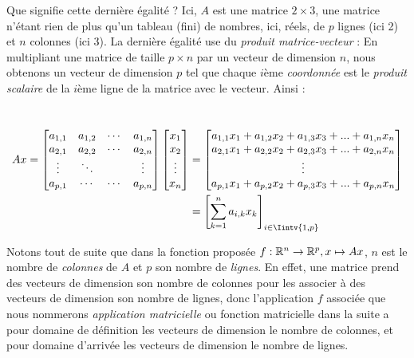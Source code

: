 Que signifie cette dernière égalité ? Ici, $A$ est une matrice $2 \times 3$, une matrice n'étant rien de plus qu'un tableau (fini) de nombres, ici, réels, de $p$ lignes (ici 2) et $n$ colonnes (ici 3). La dernière égalité use du \textit{produit matrice-vecteur} : En multipliant une matrice de taille $p \times n$ par un vecteur de dimension $n$, nous obtenons un vecteur de dimension $p$ tel que chaque $i$ème \textit{coordonnée} est le \textit{produit scalaire} de la $i$ème ligne de la matrice avec le vecteur. Ainsi :
\begin{boxdef}
\label{trueDefProduitMatVec}
\, \begin{align*}
Ax = \begin{bmatrix} a_{1,1} & a_{1,2} & \cdots & a_{1, n} \\ a_{2,1} & a_{2,2} & \cdots & a_{2, n} \\ \vdots & \ddots & & \vdots \\ a_{p,1} & \cdots & \cdots & a_{p,n} \end{bmatrix}\begin{bmatrix} x_1 \\ x_2 \\ \vdots \\ x_n \end{bmatrix}
&= \begin{bmatrix} a_{1,1}x_1 + a_{1,2}x_2 + a_{1,3}x_3 + ... + a_{1, n}x_n \\ a_{2,1}x_1 + a_{2,2}x_2 + a_{2,3}x_3 + ... + a_{2, n}x_n \\ \vdots \\ a_{p,1}x_1 + a_{p,2}x_2 + a_{p,3}x_3 + ... + a_{p, n}x_n \end{bmatrix} \\
&=  \left[\sum_{k = 1}^n a_{i,k}x_k\right]_{i \in \Iintv{1,p}}
\end{align*}
\end{boxdef}
Notons tout de suite que dans la fonction proposée $f: \mathbb{R}^n \to \mathbb{R}^p, x \mapsto Ax$, $n$ est le nombre de \textit{colonnes} de $A$ et $p$ son nombre de \textit{lignes}. En effet, une matrice prend des vecteurs de dimension son nombre de colonnes pour les associer à des vecteurs de dimension son nombre de lignes, donc l'application $f$ associée que nous nommerons \textit{application matricielle} ou fonction matricielle dans la suite a pour domaine de définition les vecteurs de dimension le nombre de colonnes, et pour domaine d'arrivée les vecteurs de dimension le nombre de lignes.\\

